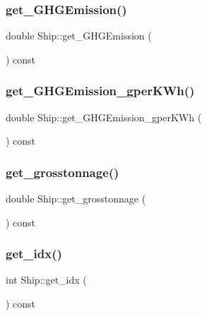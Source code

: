\mbox{\label{class_ship_af556bb0ce92e950e16eec928f3d18300}} 
\subsubsection{\texorpdfstring{get\_GHGEmission()}{get\_GHGEmission()}}
{\footnotesize\ttfamily double Ship\+::get\+\_\+\+G\+H\+G\+Emission (\begin{DoxyParamCaption}{ }\end{DoxyParamCaption}) const}

\mbox{\label{class_ship_a80885b4891a72f091848642fee017054}} 
\subsubsection{\texorpdfstring{get\_GHGEmission\_gperKWh()}{get\_GHGEmission\_gperKWh()}}
{\footnotesize\ttfamily double Ship\+::get\+\_\+\+G\+H\+G\+Emission\+\_\+gper\+K\+Wh (\begin{DoxyParamCaption}{ }\end{DoxyParamCaption}) const}

\mbox{\label{class_ship_aa3f9fa5e1ac6eba7b4608ba437c110ff}} 
\subsubsection{\texorpdfstring{get\_grosstonnage()}{get\_grosstonnage()}}
{\footnotesize\ttfamily double Ship\+::get\+\_\+grosstonnage (\begin{DoxyParamCaption}{ }\end{DoxyParamCaption}) const}

\mbox{\label{class_ship_a2bb4533c2d9ccd6c92668ff3d7132f43}} 
\subsubsection{\texorpdfstring{get\_idx()}{get\_idx()}}
{\footnotesize\ttfamily int Ship\+::get\+\_\+idx (\begin{DoxyParamCaption}{ }\end{DoxyParamCaption}) const}

